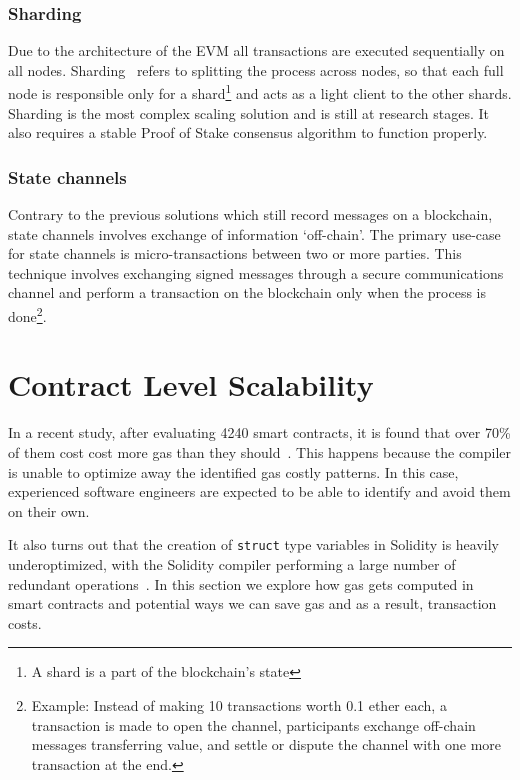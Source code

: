 \subsubsection*{Sharding}
Due to the architecture of the EVM all transactions are executed sequentially on all nodes. Sharding~\cite{sharding} refers to splitting the process across nodes, so that each full node is responsible only for a shard\footnote{A shard is a part of the blockchain's state} and acts as a light client to the other shards. Sharding is the most complex scaling solution and is still at research stages. It also requires a stable Proof of Stake consensus algorithm to function properly.

\subsubsection*{State channels}
Contrary to the previous solutions which still record messages on a blockchain, state channels involves exchange of information `off-chain'. The primary use-case for state channels is micro-transactions between two or more parties. This technique involves exchanging signed messages through a secure communications channel and perform a transaction on the blockchain only when the process is done\footnote{Example: Instead of making 10 transactions worth 0.1 ether each, a transaction is made to open the channel, participants exchange off-chain messages transferring value, and settle or dispute the channel with one more transaction at the end.}.

\section{Contract Level Scalability}
In a recent study, after evaluating 4240 smart contracts, it is found that over 70\% of them cost cost more gas than they should~\cite{DBLP:journals/corr/ChenLLZ17}. This happens because the compiler is unable to optimize away the identified gas costly patterns. In this case, experienced software engineers are expected to be able to identify and avoid them on their own. 

It also turns out that the creation of \texttt{struct} type variables in Solidity is heavily underoptimized, with the Solidity compiler performing a large number of redundant operations~\cite{solc}. In this section we explore how gas gets computed in smart contracts and potential ways we can save gas and as a result, transaction costs.


